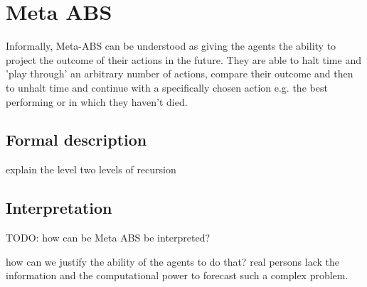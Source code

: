\section{Meta ABS}
Informally, Meta-ABS can be understood as giving the agents the ability to project the outcome of their actions in the future. They are able to halt time and 'play through' an arbitrary number of actions, compare their outcome and then to unhalt time and continue with a specifically chosen action e.g. the best performing or in which they haven't died. 

\subsection{Formal description}
explain the level two levels of recursion

\subsection{Interpretation}
TODO: how can be Meta ABS be interpreted?

how can we justify the ability of the agents to do that? real persons lack the information and the computational power to forecast such a complex problem. 
